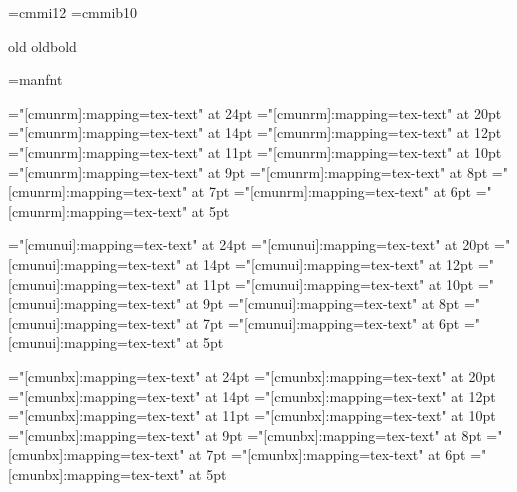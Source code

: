 

\setfonts[/11pt]
\setfonts[CMRoman/]
\def\smallish{\setfonts[/mag.9]}
\def\smaller{\setfonts[/mag.8]}
\def\smallest{\setfonts[/mag.7]}
\def\larger{\setfonts[/mag1.2]}
\def\largest{\setfonts[/mag1.3]}
\font\twelvei=cmmi12
\font\tenmib=cmmib10
\def\xiioldrm{ \twelvei\relax}
\def\xoldbf{\tenmib\relax}

\DefStyle old     {\xiioldrm}
\DefStyle oldbold {\xoldbf}


\font\manual=manfnt

\def\scshape{%
\font\sc="[cmunrm]:+smcp:mapping=tex-text" at \fontdimen6\font
\sc%
}

\font\twentyfourrm="[cmunrm]:mapping=tex-text"  at 24pt
\font\twentyrm="[cmunrm]:mapping=tex-text"      at 20pt
\font\fourteenrm="[cmunrm]:mapping=tex-text"    at 14pt
\font\twelverm="[cmunrm]:mapping=tex-text"      at 12pt
\font\elevenrm="[cmunrm]:mapping=tex-text"      at 11pt
\font\tenrm="[cmunrm]:mapping=tex-text"         at 10pt
\font\ninerm="[cmunrm]:mapping=tex-text"        at 9pt
\font\eightrm="[cmunrm]:mapping=tex-text"       at 8pt
\font\sevenrm="[cmunrm]:mapping=tex-text"       at 7pt
\font\sixrm="[cmunrm]:mapping=tex-text"         at 6pt
\font\fiverm="[cmunrm]:mapping=tex-text"        at 5pt

\font\twentyfourui="[cmunui]:mapping=tex-text"  at 24pt
\font\twentyui="[cmunui]:mapping=tex-text"      at 20pt
\font\fourteenui="[cmunui]:mapping=tex-text"    at 14pt
\font\twelveui="[cmunui]:mapping=tex-text"      at 12pt
\font\elevenui="[cmunui]:mapping=tex-text"      at 11pt
\font\tenui="[cmunui]:mapping=tex-text"         at 10pt
\font\nineui="[cmunui]:mapping=tex-text"        at 9pt
\font\eightui="[cmunui]:mapping=tex-text"       at 8pt
\font\sevenui="[cmunui]:mapping=tex-text"       at 7pt
\font\sixui="[cmunui]:mapping=tex-text"         at 6pt
\font\fiveui="[cmunui]:mapping=tex-text"        at 5pt

\font\twentyfourbf="[cmunbx]:mapping=tex-text"  at 24pt
\font\twentybf="[cmunbx]:mapping=tex-text"      at 20pt
\font\fourteenbf="[cmunbx]:mapping=tex-text"    at 14pt
\font\twelvebf="[cmunbx]:mapping=tex-text"      at 12pt
\font\elevenbf="[cmunbx]:mapping=tex-text"      at 11pt
\font\tenbf="[cmunbx]:mapping=tex-text"         at 10pt
\font\ninebf="[cmunbx]:mapping=tex-text"        at 9pt
\font\eightbf="[cmunbx]:mapping=tex-text"       at 8pt
\font\sevenbf="[cmunbx]:mapping=tex-text"       at 7pt
\font\sixbf="[cmunbx]:mapping=tex-text"         at 6pt
\font\fivebf="[cmunbx]:mapping=tex-text"        at 5pt

